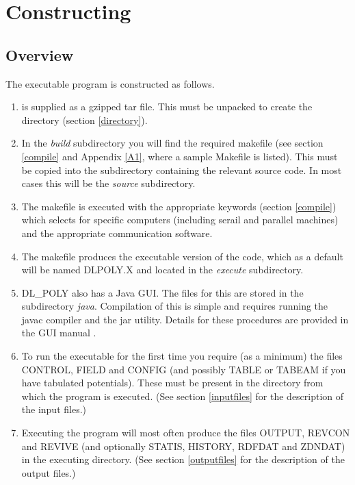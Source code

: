 
\section{Constructing \D{}}

\subsection{Overview}

The \D{} executable program is constructed as follows.

\begin{enumerate}
\item \D{} is supplied as a gzipped tar file. This must be unpacked
to create the \D{} directory (section \ref{directory}).
\item In the {\em build} subdirectory you will find the required \D{}
makefile (see section \ref{compile} and Appendix \ref{A1}, where a
sample Makefile is listed). This must
be copied into the subdirectory containing the relevant source
code. In most cases this will be the {\em source} subdirectory.
\item The makefile is executed with the appropriate keywords
(section \ref{compile}) which selects for specific computers (including
serail and parallel machines) and the appropriate communication software.  
\item The makefile produces the executable version of the code, which
as a default will be named DLPOLY.X and located in the {\em execute}
subdirectory.
\item DL\_POLY also has a Java GUI. The files for
this are stored in the subdirectory {\em java}. Compilation of this is
simple and requires running the javac compiler and the jar
utility. Details for these procedures are provided in the GUI manual
\cite{smith-gui}.
\item To run the executable for the first time you require (as a
minimum) the files CONTROL, FIELD and CONFIG (and possibly TABLE or
TABEAM if you have tabulated potentials). These must be present in
the directory from which the program is executed. (See section
\ref{inputfiles} for the description of the input files.)
\item Executing the program will most often produce the files OUTPUT,
REVCON and REVIVE (and optionally STATIS, HISTORY, RDFDAT and
ZDNDAT) in the executing directory.  (See section \ref{outputfiles}
for the description of the output files.)
\end{enumerate}

